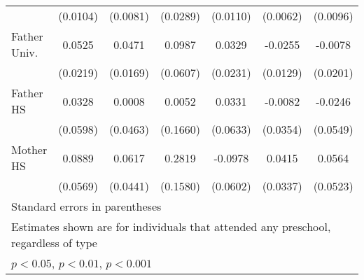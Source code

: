 \begin{table}[htbp]
\begin{tabular}{l*{6}{c}}
            &    (0.0104)         &    (0.0081)         &    (0.0289)         &    (0.0110)         &    (0.0062)         &    (0.0096)         \\
\addlinespace
Father Univ.&      0.0525\sym{*}  &      0.0471\sym{**} &      0.0987         &      0.0329         &     -0.0255\sym{*}  &     -0.0078         \\
            &    (0.0219)         &    (0.0169)         &    (0.0607)         &    (0.0231)         &    (0.0129)         &    (0.0201)         \\
\addlinespace
Father HS   &      0.0328         &      0.0008         &      0.0052         &      0.0331         &     -0.0082         &     -0.0246         \\
            &    (0.0598)         &    (0.0463)         &    (0.1660)         &    (0.0633)         &    (0.0354)         &    (0.0549)         \\
\addlinespace
Mother HS   &      0.0889         &      0.0617         &      0.2819         &     -0.0978         &      0.0415         &      0.0564         \\
            &    (0.0569)         &    (0.0441)         &    (0.1580)         &    (0.0602)         &    (0.0337)         &    (0.0523)         \\
\bottomrule
\multicolumn{7}{l}{\footnotesize Standard errors in parentheses}\\
\multicolumn{7}{l}{\footnotesize Estimates shown are for individuals that attended any preschool, regardless of type}\\
\multicolumn{7}{l}{\footnotesize \sym{*} \(p<0.05\), \sym{**} \(p<0.01\), \sym{***} \(p<0.001\)}\\
\end{tabular}
\end{table}
